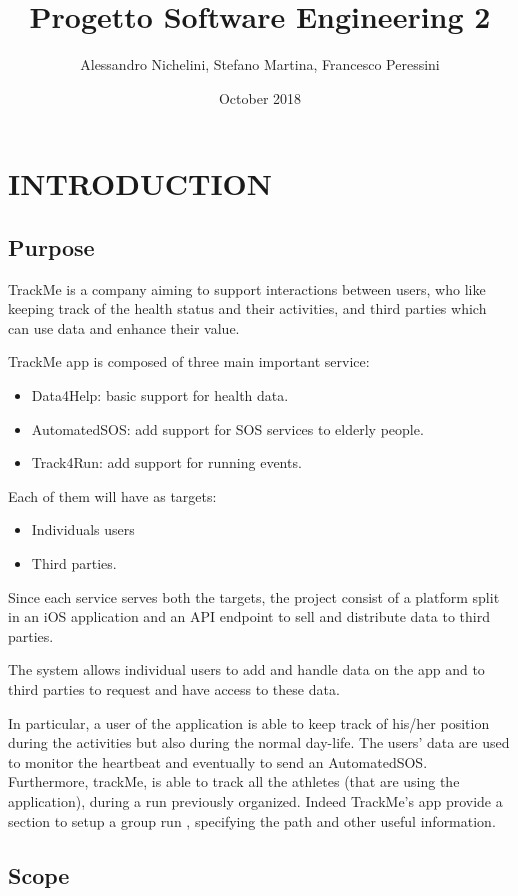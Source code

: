 \documentclass{article}
\title{Progetto Software Engineering 2}
\author{Alessandro Nichelini, Stefano Martina, Francesco Peressini}
\date{October 2018}
\begin{document}
\maketitle

\section{INTRODUCTION}

\subsection{Purpose}

TrackMe is a company aiming to support interactions between users, who like keeping track of the health status and their activities, and third parties which can use data and enhance their value.

TrackMe app is composed of three main important service:
\begin{itemize}
\item Data4Help: basic support for health data.
\item AutomatedSOS: add support for SOS services to elderly people. 
\item Track4Run: add support for running events.
\end{itemize}

Each of them will have as targets:
\begin{itemize}
\item Individuals users
\item Third parties.
\end{itemize}
Since each service serves both the targets, the project consist of a platform split in an iOS application and an API endpoint to sell and distribute data to third parties.

The system allows individual users to add and handle data on the app and to third parties to request and have access to these data.

In particular, a user of the application is able to keep track of his/her position during the activities but also during the normal day-life. The users’ data are used to monitor the heartbeat and eventually to send an AutomatedSOS.
Furthermore, trackMe, is able to track all the athletes (that are using the application), during a run previously organized. Indeed TrackMe’s app provide a section to setup a group run , specifying the path and other useful information.

\subsection{Scope}
 
\end{document}

